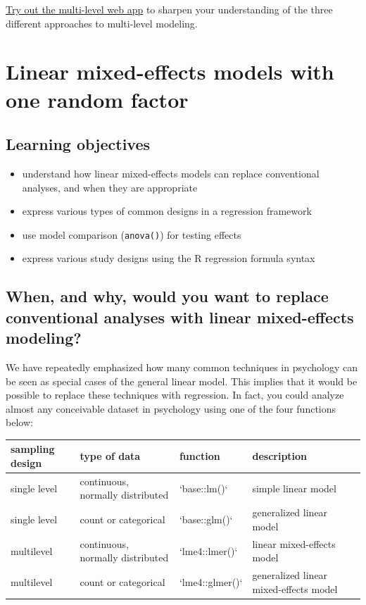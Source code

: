 \documentclass[]{book}
\providecommand{\tightlist}{%
  \setlength{\itemsep}{0pt}\setlength{\parskip}{0pt}}
\begin{document}
\href{https://shiny.psy.gla.ac.uk/Dale/multilevel}{Try out the multi-level web app} to sharpen your understanding of the three different approaches to multi-level modeling.

\hypertarget{linear-mixed-effects-models-with-one-random-factor}{%
\chapter{Linear mixed-effects models with one random factor}\label{linear-mixed-effects-models-with-one-random-factor}}

\hypertarget{learning-objectives}{%
\section{Learning objectives}\label{learning-objectives}}

\begin{itemize}
\tightlist
\item
  understand how linear mixed-effects models can replace conventional analyses, and when they are appropriate
\item
  express various types of common designs in a regression framework
\item
  use model comparison (\texttt{anova()}) for testing effects
\item
  express various study designs using the R regression formula syntax
\end{itemize}

\hypertarget{when-and-why-would-you-want-to-replace-conventional-analyses-with-linear-mixed-effects-modeling}{%
\section{When, and why, would you want to replace conventional analyses with linear mixed-effects modeling?}\label{when-and-why-would-you-want-to-replace-conventional-analyses-with-linear-mixed-effects-modeling}}

We have repeatedly emphasized how many common techniques in psychology can be seen as special cases of the general linear model. This implies that it would be possible to replace these techniques with regression. In fact, you could analyze almost any conceivable dataset in psychology using one of the four functions below:

\begin{tabular}{l|l|l|l}
\hline
sampling design & type of data & function & description\\
\hline
single level & continuous, normally distributed & `base::lm()` & simple linear model\\
\hline
single level & count or categorical & `base::glm()` & generalized linear model\\
\hline
multilevel & continuous, normally distributed & `lme4::lmer()` & linear mixed-effects model\\
\hline
multilevel & count or categorical & `lme4::glmer()` & generalized linear mixed-effects model\\
\hline
\end{tabular}
\end{document}
